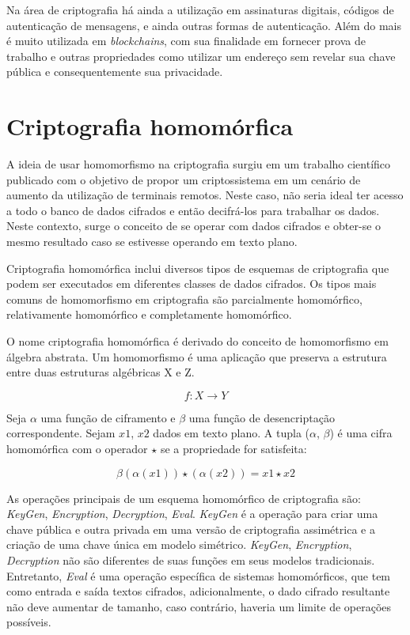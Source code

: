\documentclass{ufsctex/ufsctex}
\begin{document}
Na área de criptografia há ainda a utilização em assinaturas digitais, códigos
de autenticação de mensagens, e ainda outras formas de autenticação. Além do
mais é  muito utilizada em \textit{blockchains}, com sua finalidade em fornecer
prova de trabalho e outras propriedades como utilizar um endereço sem revelar
sua chave pública e consequentemente sua privacidade.\cite{hashBlockchain}

\section{Criptografia homomórfica}

A ideia de usar homomorfismo na criptografia surgiu em um trabalho científico
publicado com o objetivo de propor um criptossistema em um cenário de aumento
da utilização de terminais remotos. Neste caso, não seria ideal ter acesso a
todo o banco de dados cifrados e então decifrá-los para trabalhar os dados.
Neste contexto, surge o conceito de se operar com dados cifrados e obter-se o
mesmo resultado caso se estivesse operando em texto plano.\cite{homomorphic}

Criptografia homomórfica inclui diversos tipos de esquemas de criptografia que
podem ser executados em diferentes classes de dados cifrados. Os tipos mais
comuns de homomorfismo em criptografia são parcialmente homomórfico,
relativamente homomórfico e completamente homomórfico.\cite{survey-homo}

O nome criptografia homomórfica é derivado do conceito de homomorfismo em
álgebra abstrata. Um homomorfismo é uma aplicação que preserva a estrutura
entre duas estruturas algébricas X e Z.

\begin{equation}
f : X \longrightarrow Y
\end{equation}

Seja $\alpha$ uma função de ciframento e $\beta$ uma função de desencriptação
correspondente. Sejam $x1$, $x2$ dados em texto plano. A tupla ($\alpha$,
$\beta$) é uma cifra homomórfica com o operador $\star$ se a propriedade for
satisfeita:

\begin{equation}
\beta (\alpha(x1)) \star (\alpha(x2)) = x1 \star x2
\end{equation}

As operações principais de um esquema homomórfico de criptografia são:
\textit{KeyGen}, \textit{Encryption}, \textit{Decryption}, \textit{Eval}.
\textit{KeyGen} é a operação para criar uma chave pública e outra privada em uma
versão de criptografia assimétrica e a criação de uma chave única em modelo
simétrico. \textit{KeyGen}, \textit{Encryption}, \textit{Decryption} não são
diferentes de suas funções em seus modelos tradicionais.  Entretanto,
\textit{Eval} é uma operação específica de sistemas homomórficos, que tem como
entrada e saída textos cifrados, adicionalmente, o dado cifrado resultante não
deve aumentar de tamanho, caso contrário, haveria um limite de operações
possíveis.\cite{survey-homo}
\end{document}
